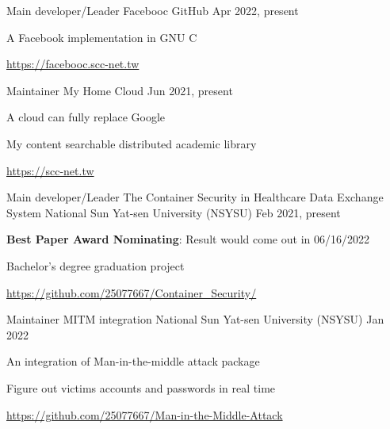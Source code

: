 

\begin{cventries}

    \cventry
    {Main developer/Leader}
    {Facebooc}
    {GitHub} %
    {Apr 2022, present} %
    {
        \begin{cvitems} %
            \item {A Facebook implementation in GNU C}
            \item {\url{https://facebooc.scc-net.tw}}
        \end{cvitems}
    }

    \cventry
    {Maintainer}
    {My Home Cloud}
    {} %
    {Jun 2021, present} %
    {
        \begin{cvitems} %
            \item {A cloud can fully replace Google}
            \item {My content searchable distributed academic library}
            \item {\url{https://scc-net.tw}}
        \end{cvitems}
    }

    \cventry
    {Main developer/Leader}
    {The Container Security in Healthcare Data Exchange System}
    {National Sun Yat-sen University (NSYSU)} %
    {Feb 2021, present} %
    {
        \begin{cvitems} %
            \item {\textbf{Best Paper Award Nominating}: Result would come out in 06/16/2022}
            \item {Bachelor's degree graduation project}
            \item {\url{https://github.com/25077667/Container_Security/}}
        \end{cvitems}
    }

    \cventry
    {Maintainer}
    {MITM integration}
    {National Sun Yat-sen University (NSYSU)} %
    {Jan 2022} %
    {
        \begin{cvitems} %
            \item {An integration of Man-in-the-middle attack package}
            \item {Figure out victims accounts and passwords in real time}
            \item {\url{https://github.com/25077667/Man-in-the-Middle-Attack}}
        \end{cvitems}
    }


\end{cventries}
